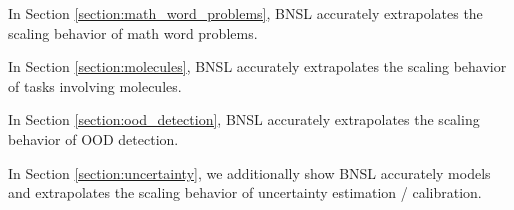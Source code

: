 \documentclass{article} %
\begin{document}
\vspace{-2.1mm}

In Section \ref{section:math_word_problems}, BNSL accurately extrapolates the scaling behavior of math word problems.

\vspace{-2.1mm}

In Section \ref{section:molecules}, BNSL accurately extrapolates the scaling behavior of tasks involving molecules.

\vspace{-2.1mm}

In Section \ref{section:ood_detection}, BNSL accurately extrapolates the scaling behavior of OOD detection.

\vspace{-2.1mm}

In Section \ref{section:uncertainty}, we additionally show BNSL accurately models and extrapolates the scaling behavior of uncertainty estimation / calibration.

\vspace{-4.0mm}


\iffalse
\end{document}
